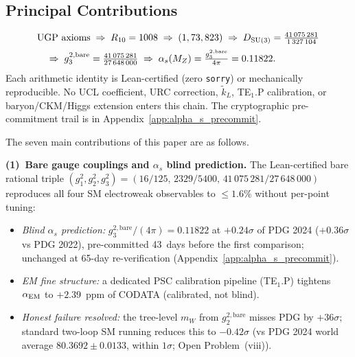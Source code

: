 \documentclass[11pt]{article}
\theoremstyle{remark}
\begin{document}
\subsection{Principal Contributions}
\label{subsec:contributions}

\begin{tcolorbox}[colback=blue!4,colframe=blue!45!black,
  title={\textbf{Example of a complete Category-A chain: the blind $\alpha_s$ prediction}},
  fonttitle=\bfseries,left=6pt,right=6pt,top=5pt,bottom=5pt]
\small
\begin{align*}
&\text{UGP axioms}
\;\Rightarrow\;R_{10}=1008
\;\Rightarrow\;(1,73,823)
\;\Rightarrow\;D_{\rm SU(3)}=\tfrac{41\,075\,281}{1\,327\,104}\\[2pt]
&\quad\Rightarrow\;g_3^{2,\rm bare}=\tfrac{41\,075\,281}{27\,648\,000}
\;\Rightarrow\;\alpha_s(M_Z)=\tfrac{g_3^{2,\rm bare}}{4\pi}=0.11822.
\end{align*}
Each arithmetic identity is Lean-certified (zero \texttt{sorry}) or mechanically reproducible.
No UCL coefficient, URC correction, $\tilde{k}_L$, TE$_1$.P calibration, or baryon/CKM/Higgs extension enters this chain.
The cryptographic pre-commitment trail is in Appendix~\ref{app:alpha_s_precommit}.
\end{tcolorbox}

The seven main contributions of this paper are as follows.

\medskip
\noindent\textbf{(1)~Bare gauge couplings and $\alpha_s$ blind prediction.}
The Lean-certified bare rational triple $(g_1^2, g_2^2, g_3^2) = (16/125,\,2329/5400,\,41\,075\,281/27\,648\,000)$ reproduces all four SM electroweak observables to $\le 1.6\%$ without per-point tuning:
\begin{itemize}[leftmargin=1.5em,itemsep=0.15em,topsep=0.2em]
  \item \emph{Blind $\alpha_s$ prediction:} $g_3^{2,\mathrm{bare}}/(4\pi) = 0.11822$ at $+0.24\sigma$ of PDG 2024 ($+0.36\sigma$ vs PDG 2022), pre-committed 43~days before the first comparison; unchanged at 65-day re-verification (Appendix~\ref{app:alpha_s_precommit}).
  \item \emph{EM fine structure:} a dedicated PSC calibration pipeline (TE$_1$.P) tightens $\alpha_{\rm EM}$ to $+2.39$~ppm of CODATA (calibrated, not blind).
  \item \emph{Honest failure resolved:} the tree-level $m_W$ from $g_2^{2,\mathrm{bare}}$ misses PDG by $+36\sigma$; standard two-loop SM running reduces this to $-0.42\sigma$ (vs PDG 2024 world average $80.3692 \pm 0.0133$, within $1\sigma$; Open Problem~(viii)).
\end{itemize}
\end{document}
